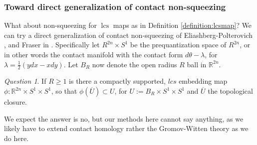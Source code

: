 \documentclass{amsart}
\numberwithin{equation}{section}
\newtheorem{theorem}[equation]{Theorem}
\theoremstyle{definition}
\theoremstyle{remark}
\newtheorem{remark}[equation]{Remark}
\newtheorem{question}{Question}
\DeclareMathOperator {\area} {area}
\DeclareMathOperator{\lcs}{lcs}
\begin{document}
\subsubsection {Toward direct generalization of contact non-squeezing} What about non-squeezing for $\lcs$ maps as in Definition \ref{definition:lcsmap}? We can try a direct generalization of contact non-squeezing of Eliashberg-Polterovich \cite{citeEKPcontactnonsqueezing}, and Fraser in \cite{citeFraserNonsqueezing}.
Specifically let $R ^{2n}  \times S ^{1}  $ be the prequantization space of $R ^{2n} $, or in other words the contact manifold with the contact form $d\theta - \lambda$, for $\lambda = \frac{1}{2}(ydx - xdy)$. Let $B _{R} $ now denote the open radius $R$ ball in $\mathbb{R} ^{2n} $. 
\begin{question} \label{q:contactnonsqueezing} If $R \geq 1$ is there a compactly supported, $lcs$ embedding map $\phi: \mathbb{R} ^{2n} \times S ^{1} \times S ^{1}  $, so that $\phi (\overline{U} ) \subset U$, for $U := B _{R} \times S ^{1} \times S ^{1}  $ and $\overline{U} $ the topological closure.
\end{question}
We expect the answer is no, but our methods here cannot say anything, as we likely have to extend contact homology rather the Gromov-Witten theory as we do here. 

\end{document}
